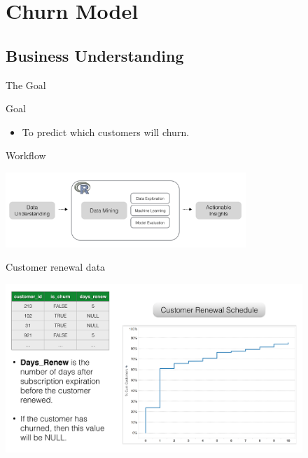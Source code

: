 \documentclass[10pt]{beamer}
\begin{document}
\section{Churn Model}

  \subsection{Business Understanding}

      \begin{frame}{The Goal}
        \begin{block}{Goal}
            \begin{itemize}
              \item To predict which customers will churn.
            \end{itemize}
        \end{block}
        \begin{block}{Workflow}
          \begin{center}
            \includegraphics[height=80pt]{../graphs/churnmodel_workflow}
          \end{center}
        \end{block}
      \end{frame}

    \begin{frame}{Customer renewal data}
      \begin{center}
        \includegraphics[height=180pt]{../graphs/datasets_customer_renew}
      \end{center}
    \end{frame}
\end{document}
